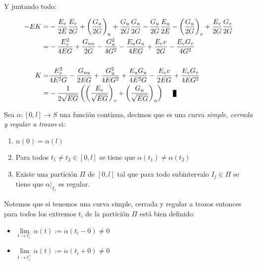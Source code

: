 \documentclass[11pt]{article}
\newenvironment{proof}[1][Demostraci\'on]{\begin{trivlist}
		\item[\hskip \labelsep {\bfseries #1}]}{\end{trivlist}}
\newenvironment{definition}[1][Definici\'on]{\begin{trivlist}
		\item[\hskip \labelsep {\bfseries #1}]}{\end{trivlist}}
\newcommand{\qed}{\nobreak \ifvmode \relax \else
	\ifdim\lastskip<1.5em \hskip-\lastskip
	\hskip1.5em plus0em minus0.5em \fi \nobreak
	\vrule height0.75em width0.5em depth0.25em\fi}
\begin{document}
\begin{proof}
	Y juntando todo:
	
	\begin{equation*}
	\begin{aligned}
		-EK = & -\dfrac{E_v}{2E}\dfrac{E_v}{2G} + \left(\dfrac{G_u}{2G}\right)_u + \dfrac{G_u}{2G}\dfrac{G_u}{2G} - \dfrac{G_u}{2G}\dfrac{E_u}{2E} - \left(\dfrac{G_u}{2G}\right)_v + \dfrac{E_v}{2G}  \dfrac{G_v}{2G} \\
			= & - \dfrac{E_v^2}{4EG} + \dfrac{G_{uu}}{2G} - \dfrac{G_{u}^2}{4G^2} - \dfrac{E_uG_u}{4EG} + \dfrac{E_vv}{2G} - \dfrac{E_vG_v}{4G^2} \\
			\\
		K = & \dfrac{E_v^2}{4E^2G} - \dfrac{G_{uu}}{2EG} + \dfrac{G_{u}^2}{4EG^2} + \dfrac{E_uG_u}{4E^2G} - \dfrac{E_vv}{2EG} + \dfrac{E_vG_v}{4EG^2} \\
		= &  -\dfrac{1}{2\sqrt{EG}} \left(\left(\dfrac{E_v}{\sqrt{EG}}\right)_v + \left(\dfrac{G_u}{\sqrt{EG}}\right)_u \right) \qed
	\end{aligned}
	\end{equation*}
	
\end{proof}

\begin{definition}
	Sea $\alpha:[0,l] \rightarrow S$ una funci\'on continua, decimos que es una curva \textit{simple, cerrada y regular a trozos} si:
	
	\begin{enumerate}
		
		\item $\alpha(0) = \alpha(l) $ 
		\item Para todos $t_1 \neq t_2 \in [0,l]$ se tiene que $\alpha(t_1) \neq \alpha(t_2)$
		\item Existe una partici\'on $\Pi$ de $[0,l]$ tal que para todo subintervalo $I_j \in \Pi$ se tiene que $\alpha |_{I_j}$ es regular.
		
	\end{enumerate}
	
\end{definition}

Notemos que si tenemos una curva simple, cerrada y regular a trozos entonces para todos los extremos $t_i$ de la partici\'on $\Pi$ est\'a bien definido:

\begin{itemize}
	\item $\lim\limits_{t \rightarrow t_i^-}{\dot{\alpha}(t)} := \dot{\alpha}(t_i - 0) \neq 0$
	\item $\lim\limits_{t \rightarrow t_i^+}{\dot{\alpha}(t)} := \dot{\alpha}(t_i + 0) \neq 0$
\end{itemize}
\end{document}
